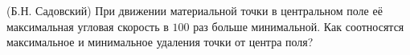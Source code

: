 (Б.Н. Садовский)
При движении материальной точки в центральном поле её максимальная
угловая скорость в $100$ раз больше минимальной. Как соотносятся
максимальное и минимальное удаления точки от центра поля?
